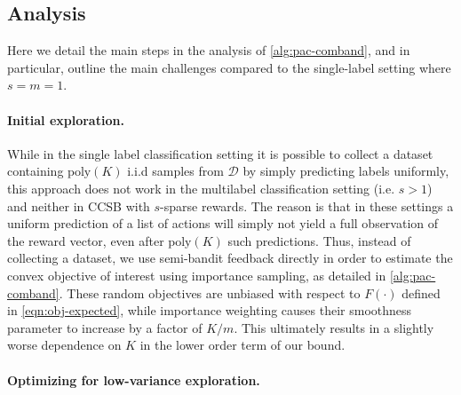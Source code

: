 \documentclass[11pt]{article}
\newcommand{\tk}[1]{\textcolor{magenta}{\bf \{TK: #1\}}}
\newcommand{\calD}{\mathcal{D}}
\newcommand{\obj}{F}
\theoremstyle{plain}
\begin{document}
\subsection{Analysis}
\label{sec:pac-analysis}

Here we detail the main steps in the analysis of \cref{alg:pac-comband}, and in particular, outline the main challenges compared to the single-label setting where $s=m=1$.

\paragraph{Initial exploration.}
% 
While in the single label classification setting it is possible to collect a dataset containing $\mathrm{poly}(K)$ i.i.d samples from $\calD$ by simply predicting labels uniformly, this approach does not work in the multilabel classification setting (i.e. $s > 1$) and neither in CCSB with $s$-sparse rewards. The reason is that in these settings a uniform prediction of a list of actions will simply not yield a full observation of the reward vector, even after $\mathrm{poly}(K)$ such predictions. Thus, instead of collecting a dataset, we use semi-bandit feedback directly in order to estimate the convex objective of interest using importance sampling, as detailed in \cref{alg:pac-comband}. These random objectives are unbiased with respect to $\obj(\cdot)$ defined in \cref{eqn:obj-expected}, while importance weighting causes their smoothness parameter to increase by a factor of $K/m$. This ultimately results in  
a slightly worse dependence on $K$ in the lower order term of our bound.

\paragraph{Optimizing for low-variance exploration.}
\end{document}
